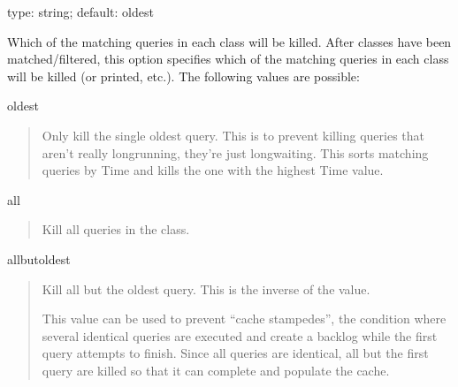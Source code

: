 \documentclass[letterpaper,10pt,english]{sphinxmanual}
\begin{document}
\begin{fulllineitems}
\label{\detokenize{mariadb-kill:cmdoption-mariadb-kill-victims}}
type: string; default: oldest

Which of the matching queries in each class will be killed.  After classes
have been matched/filtered, this option specifies which of the matching
queries in each class will be killed (or printed, etc.).  The following
values are possible:

oldest
\begin{quote}

Only kill the single oldest query.  This is to prevent killing queries that
aren’t really long\sphinxhyphen{}running, they’re just long\sphinxhyphen{}waiting.  This sorts matching
queries by Time and kills the one with the highest Time value.
\end{quote}

all
\begin{quote}

Kill all queries in the class.
\end{quote}

all\sphinxhyphen{}but\sphinxhyphen{}oldest
\begin{quote}

Kill all but the oldest query.  This is the inverse of the  value.

This value can be used to prevent “cache stampedes”, the condition where
several identical queries are executed and create a backlog while the first
query attempts to finish.  Since all queries are identical, all but the first
query are killed so that it can complete and populate the cache.
\end{quote}

\end{fulllineitems}

\end{document}
